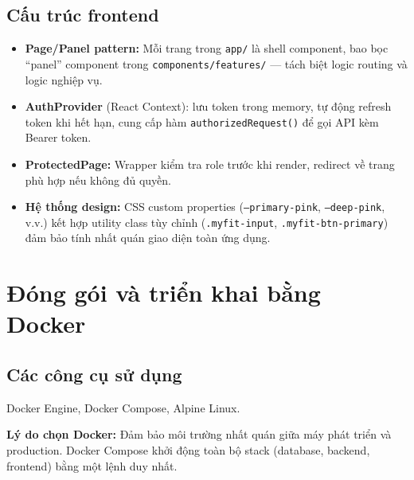 \subsection{Cấu trúc frontend}
\begin{itemize}
    \item \textbf{Page/Panel pattern:} Mỗi trang trong \texttt{app/} là shell component, bao bọc ``panel'' component trong \texttt{components/features/} — tách biệt logic routing và logic nghiệp vụ.
    \item \textbf{AuthProvider} (React Context): lưu token trong memory, tự động refresh token khi hết hạn, cung cấp hàm \texttt{authorizedRequest()} để gọi API kèm Bearer token.
    \item \textbf{ProtectedPage:} Wrapper kiểm tra role trước khi render, redirect về trang phù hợp nếu không đủ quyền.
    \item \textbf{Hệ thống design:} CSS custom properties (\texttt{--primary-pink}, \texttt{--deep-pink}, v.v.) kết hợp utility class tùy chỉnh (\texttt{.myfit-input}, \texttt{.myfit-btn-primary}) đảm bảo tính nhất quán giao diện toàn ứng dụng.
\end{itemize}

\section{Đóng gói và triển khai bằng Docker}
\subsection{Các công cụ sử dụng}
Docker Engine, Docker Compose, Alpine Linux.

\textbf{Lý do chọn Docker:} Đảm bảo môi trường nhất quán giữa máy phát triển và production. Docker Compose khởi động toàn bộ stack (database, backend, frontend) bằng một lệnh duy nhất.


